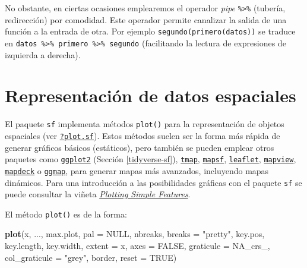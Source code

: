 \documentclass[
]{book}
\newenvironment{Shaded}{\begin{snugshade}}{\end{snugshade}}
\newcommand{\AttributeTok}[1]{\textcolor[rgb]{0.13,0.29,0.53}{#1}}
\newcommand{\ConstantTok}[1]{\textcolor[rgb]{0.56,0.35,0.01}{#1}}
\newcommand{\FunctionTok}[1]{\textcolor[rgb]{0.13,0.29,0.53}{\textbf{#1}}}
\newcommand{\NormalTok}[1]{#1}
\newcommand{\StringTok}[1]{\textcolor[rgb]{0.31,0.60,0.02}{#1}}
\theoremstyle{break}
\theoremstyle{definition}
\theoremstyle{definition}
\theoremstyle{definition}
\theoremstyle{definition}
\theoremstyle{remark}
\begin{document}
No obstante, en ciertas ocasiones emplearemos el operador \emph{pipe} \texttt{\%\textgreater{}\%} (tubería, redirección) por comodidad.
Este operador permite canalizar la salida de una función a la entrada de otra.
Por ejemplo \texttt{segundo(primero(datos))} se traduce en \texttt{datos\ \%\textgreater{}\%\ primero\ \%\textgreater{}\%\ segundo}
(facilitando la lectura de expresiones de izquierda a derecha).

\section{Representación de datos espaciales}\label{sf-plot}

El paquete \texttt{sf} implementa métodos \texttt{plot()} para la representación de objetos espaciales (ver \href{https://r-spatial.github.io/sf/reference/plot.html}{\texttt{?plot.sf}}).
Estos métodos suelen ser la forma más rápida de generar gráficos básicos (estáticos), pero también se pueden emplear otros paquetes como \href{https://ggplot2.tidyverse.org}{\texttt{ggplot2}} (Sección \ref{tidyverse-sf}), \href{https://r-tmap.github.io/tmap}{\texttt{tmap}}, \href{https://riatelab.github.io/mapsf}{\texttt{mapsf}}, \href{https://rstudio.github.io/leaflet}{\texttt{leaflet}}, \href{https://r-spatial.github.io/mapview}{\texttt{mapview}}, \href{https://symbolixau.github.io/mapdeck}{\texttt{mapdeck}} o \href{https://github.com/dkahle/ggmap}{\texttt{ggmap}}, para generar mapas más avanzados, incluyendo mapas dinámicos.
Para una introducción a las posibilidades gráficas con el paquete \texttt{sf} se puede consultar la viñeta \href{https://r-spatial.github.io/sf/articles/sf5.html}{\emph{Plotting Simple Features}}.

El método \texttt{plot()} es de la forma:

\begin{Shaded}
\begin{Highlighting}[]
\FunctionTok{plot}\NormalTok{(x, ..., max.plot, }\AttributeTok{pal =} \ConstantTok{NULL}\NormalTok{, nbreaks, }\AttributeTok{breaks =} \StringTok{"pretty"}\NormalTok{, }
\NormalTok{     key.pos, key.length, key.width, }\AttributeTok{extent =}\NormalTok{ x, }\AttributeTok{axes =} \ConstantTok{FALSE}\NormalTok{, }
     \AttributeTok{graticule =}\NormalTok{ NA\_crs\_, }\AttributeTok{col\_graticule =} \StringTok{"grey"}\NormalTok{, border, }\AttributeTok{reset =} \ConstantTok{TRUE}\NormalTok{)}
\end{Highlighting}
\end{Shaded}
\end{document}
